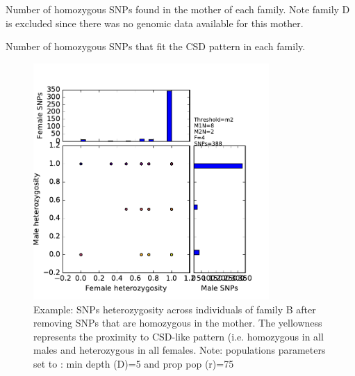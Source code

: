 \documentclass[10pt,a4paper]{report}
\begin{document}
\begin{table}
	\begin{center}
		\caption{Number of homozygous SNPs found in the mother of each family. Note family D is excluded since there was no genomic data available for this mother.}
		\label{hom_mother}
	\end{center}
\end{table}

\begin{table}
	\begin{center}
		\caption{Number of homozygous SNPs that fit the CSD pattern in each family.}
		\label{CSD_like_raw}
	\end{center}
\end{table}


\begin{figure}[h]
	\begin{center}
		\includegraphics[width=0.8\textwidth]{cleaning_genomic_data/assoc_explo_fam_no_mother/B.pdf}
		\caption{Example: SNPs heterozygosity across individuals of family B after removing SNPs that are homozygous in the mother. The yellowness represents the proximity to CSD-like pattern (i.e. homozygous in all males and heterozygous in all females. Note: populations parameters set to : min depth (D)=5 and prop pop (r)=75}
		\label{SNPs_explo_nomother}
	\end{center}
\end{figure}
\FloatBarrier
\end{document}
